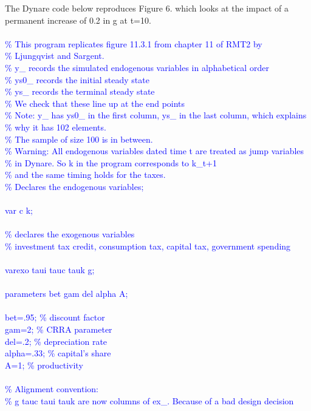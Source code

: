 \documentclass[a4paper,12pt]{scrartcl} %
\begin{document}
The Dynare code below reproduces Figure 6. which looks at the impact of a permanent increase of 0.2 in g at t=10.\\
\\
\textcolor{blue}{
\% This program replicates figure 11.3.1 from chapter 11 of RMT2 by\\
\% Ljungqvist and Sargent.\\
\% y\_ records the simulated endogenous variables in alphabetical order\\
\% ys0\_ records the initial steady state\\
\% ys\_ records the terminal steady state\\
\% We check that these line up at the end points\\
\% Note: y\_ has ys0\_ in the first column, ys\_ in the last column, which explains\\
\% why it has 102 elements.\\
\% The sample of size 100 is in between.\\
\% Warning: All endogenous variables dated time t are treated as jump variables\\
\% in Dynare. So k in the program corresponds to k\_{t+1}\\
\% and the same timing holds for the taxes.\\
\% Declares the endogenous variables;\\
\\
var c k;\\
\\
\% declares the exogenous variables\\
\% investment tax credit, consumption tax, capital tax, government spending\\
\\
varexo taui tauc tauk g;\\
\\
parameters bet gam del alpha A;\\
\\
bet=.95; \% discount factor\\
gam=2; \% CRRA parameter\\
del=.2; \% depreciation rate\\
alpha=.33; \% capital’s share\\
A=1; \% productivity\\
\\
\% Alignment convention:\\
\% g tauc taui tauk are now columns of ex\_. Because of a bad design decision\\
}
\end{document}
